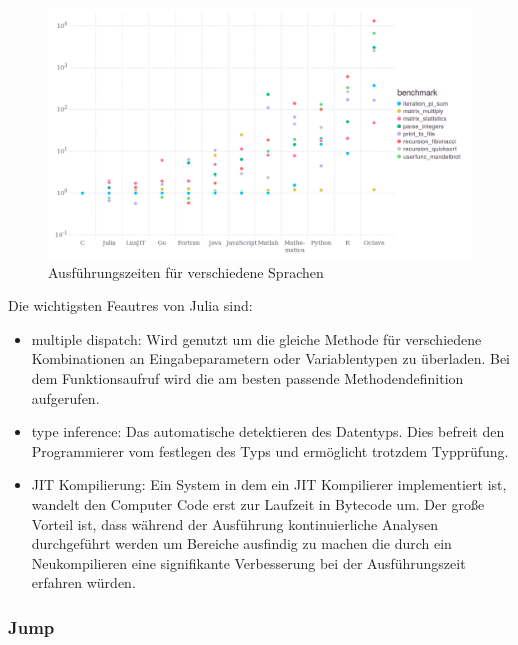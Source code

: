 \documentclass{like}
\begin{document}
\begin{figure}[ht!]
	\includegraphics[width=450pt]{Abbildungen/juliaBenchmark.png}
	\caption{Ausführungszeiten für verschiedene Sprachen}

	\label{fig:juliaBench}
\end{figure}

Die wichtigsten Feautres von Julia sind:
\begin{itemize}

	\item multiple dispatch: Wird genutzt um die gleiche Methode für verschiedene Kombinationen an Eingabeparametern oder Variablentypen zu überladen. Bei dem Funktionsaufruf wird die am besten passende Methodendefinition aufgerufen. \\
	\item type inference: Das automatische detektieren des Datentyps. Dies befreit den Programmierer vom festlegen des Typs und ermöglicht trotzdem Typprüfung. \\
	\item \ac{JIT} Kompilierung: Ein System in dem ein \ac{JIT} Kompilierer implementiert ist, wandelt den Computer Code erst zur Laufzeit in Bytecode um. Der große Vorteil ist, dass während der Ausführung kontinuierliche Analysen durchgeführt werden um Bereiche ausfindig zu machen die durch ein Neukompilieren eine signifikante Verbesserung bei der Ausführungszeit erfahren würden. \\
\end{itemize}

\subsubsection*{Jump}
\end{document}
